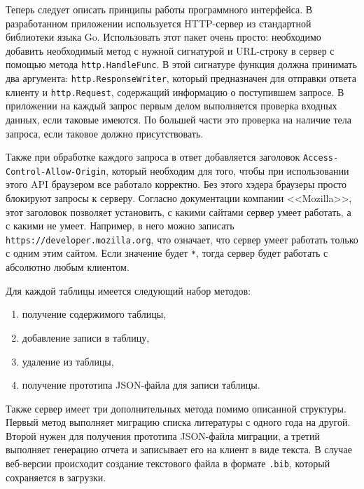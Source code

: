 Теперь следует описать принципы работы программного интерфейса. В разработанном приложении используется HTTP-сервер из стандартной
библиотеки языка Go. Использовать этот пакет очень просто: необходимо добавить необходимый метод с нужной сигнатурой и
URL-строку в сервер с помощью метода \texttt{http.HandleFunc}. В этой сигнатуре функция должна принимать два аргумента:
\texttt{http.ResponseWriter}, который предназначен для отправки ответа клиенту и \texttt{http.Request}, содержащий информацию
о поступившем запросе. В приложении на каждый запрос первым делом выполняется проверка входных данных, если таковые имеются.
По большей части это проверка на наличие тела запроса, если таковое должно присутствовать.

Также при обработке каждого запроса в ответ добавляется заголовок \texttt{Access-Control-Allow-Origin}, который необходим
для того, чтобы при использовании этого API браузером все работало корректно. Без этого хэдера браузеры просто блокируют запросы
к серверу. Согласно документации компании <<Mozilla>>\cite{Access-Control-Allow-Origin}, этот заголовок позволяет
установить, с какими сайтами сервер умеет работать, а с какими не умеет. Например, в него можно записать \texttt{https://developer.mozilla.org},
что означает, что сервер умеет работать только с одним этим сайтом. Если значение будет \texttt{*}, тогда сервер будет работать с абсолютно
любым клиентом.

Для каждой таблицы имеется следующий набор методов:

\begin{enumerate}
    \item получение содержимого таблицы,
    \item добавление записи в таблицу,
    \item удаление из таблицы,
    \item получение прототипа JSON-файла для записи таблицы.
\end{enumerate}

Также сервер имеет три дополнительных метода помимо описанной структуры. 
Первый метод выполняет миграцию списка литературы с одного года на другой.
Второй нужен для получения прототипа JSON-файла миграции, а третий выполняет генерацию отчета
и записывает его на клиент в виде текста. В случае веб-версии происходит создание текстового файла в формате \texttt{.bib}, который
сохраняется в загрузки.